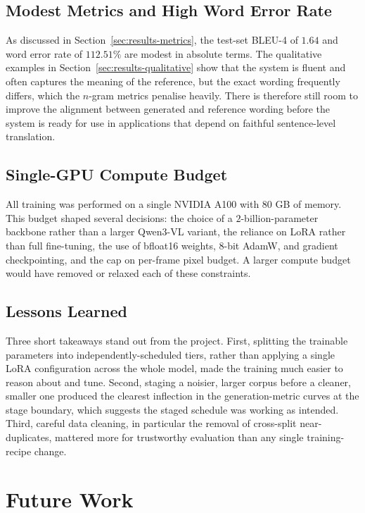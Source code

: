 \documentclass{article}
\begin{document}
\subsection{Modest Metrics and High Word Error Rate}
\label{sec:lim-metrics}

As discussed in Section~\ref{sec:results-metrics}, the test-set BLEU-4 of
$1.64$ and word error rate of $112.51\%$ are modest in absolute terms. The
qualitative examples in Section~\ref{sec:results-qualitative} show that the
system is fluent and often captures the meaning of the reference, but the
exact wording frequently differs, which the $n$-gram metrics penalise
heavily. There is therefore still room to improve the alignment between
generated and reference wording before the system is ready for use in
applications that depend on faithful sentence-level translation.

\subsection{Single-GPU Compute Budget}
\label{sec:lim-compute}

All training was performed on a single NVIDIA A100 with $80$ GB of memory.
This budget shaped several decisions: the choice of a $2$-billion-parameter
backbone rather than a larger Qwen3-VL variant, the reliance on LoRA rather
than full fine-tuning, the use of bfloat16 weights, 8-bit AdamW, and
gradient checkpointing, and the cap on per-frame pixel budget. A larger
compute budget would have removed or relaxed each of these constraints.

\subsection{Lessons Learned}
\label{sec:lim-lessons}

Three short takeaways stand out from the project. First, splitting the
trainable parameters into independently-scheduled tiers, rather than
applying a single LoRA configuration across the whole model, made the
training much easier to reason about and tune. Second, staging a noisier,
larger corpus before a cleaner, smaller one produced the clearest
inflection in the generation-metric curves at the stage boundary, which
suggests the staged schedule was working as intended. Third, careful data
cleaning, in particular the removal of cross-split near-duplicates, mattered
more for trustworthy evaluation than any single training-recipe change.


\section{Future Work}
\label{sec:future-work}
\end{document}
